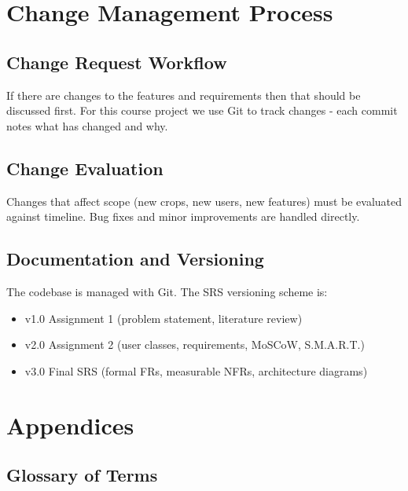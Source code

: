 \documentclass[12pt,a4paper]{article}
\begin{document}
\section{Change Management Process}

\subsection{Change Request Workflow}

If there are changes to the features and requirements then that should be discussed first. For this course project we use Git to track changes - each commit notes what has changed and why.

\subsection{Change Evaluation}

Changes that affect scope (new crops, new users, new features) must be evaluated against timeline. Bug fixes and minor improvements are handled directly.

\subsection{Documentation and Versioning}

The codebase is managed with Git. The SRS versioning scheme is:

\begin{itemize}[leftmargin=2em]
  \item v1.0 Assignment 1 (problem statement, literature review)
  \item v2.0 Assignment 2 (user classes, requirements, MoSCoW, S.M.A.R.T.)
  \item v3.0 Final SRS (formal FRs, measurable NFRs, architecture diagrams)
\end{itemize}


\section{Appendices}

\subsection{Glossary of Terms}
\end{document}
